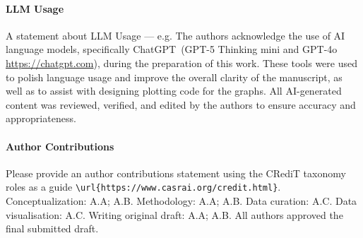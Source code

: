 \documentclass[journal=eds]{CAM-MODERN}%
\theoremstyle{definition}
\numberwithin{equation}{section}
\begin{document}
\begin{Backmatter}
\paragraph{LLM Usage}
A statement about LLM Usage --- e.g. The authors acknowledge the use of AI language models, specifically ChatGPT~(GPT-5 Thinking mini and GPT-4o \url{https://chatgpt.com}), during the preparation of this work. These tools were used to polish language usage and improve the overall clarity of the manuscript, as well as to assist with designing plotting code for the graphs. All AI-generated content was reviewed, verified, and edited by the authors to ensure accuracy and appropriateness.

\paragraph{Author Contributions}
Please provide an author contributions statement using the CRediT taxonomy roles as a guide {\verb+\url{https://www.casrai.org/credit.html}+}. Conceptualization: A.A; A.B. Methodology: A.A; A.B. Data curation: A.C. Data visualisation: A.C. Writing original draft: A.A; A.B. All authors approved the final submitted draft.

\printbibliography

\end{Backmatter}
\end{document}
